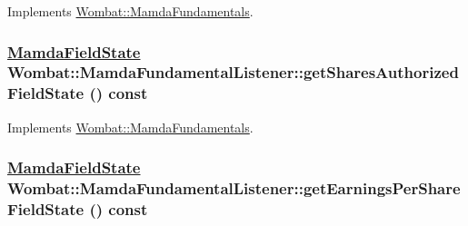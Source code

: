 Implements \hyperlink{classWombat_1_1MamdaFundamentals_bda054b607ae27172a2aea4b25224853}{Wombat::Mamda\-Fundamentals}.\hypertarget{classWombat_1_1MamdaFundamentalListener_4c92c5309a8a142cc95541447c4c1403}{
\subsubsection[getSharesAuthorizedFieldState]{\setlength{\rightskip}{0pt plus 5cm}\hyperlink{namespaceWombat_93aac974f2ab713554fd12a1fa3b7d2a}{Mamda\-Field\-State} Wombat::Mamda\-Fundamental\-Listener::get\-Shares\-Authorized\-Field\-State () const}}
\label{classWombat_1_1MamdaFundamentalListener_4c92c5309a8a142cc95541447c4c1403}




Implements \hyperlink{classWombat_1_1MamdaFundamentals_3b2e1c2ff2ec88902f4e9c7b127852cc}{Wombat::Mamda\-Fundamentals}.\hypertarget{classWombat_1_1MamdaFundamentalListener_fa468a5bdef49cfbd10ce80223058091}{
\subsubsection[getEarningsPerShareFieldState]{\setlength{\rightskip}{0pt plus 5cm}\hyperlink{namespaceWombat_93aac974f2ab713554fd12a1fa3b7d2a}{Mamda\-Field\-State} Wombat::Mamda\-Fundamental\-Listener::get\-Earnings\-Per\-Share\-Field\-State () const}}
\label{classWombat_1_1MamdaFundamentalListener_fa468a5bdef49cfbd10ce80223058091}





